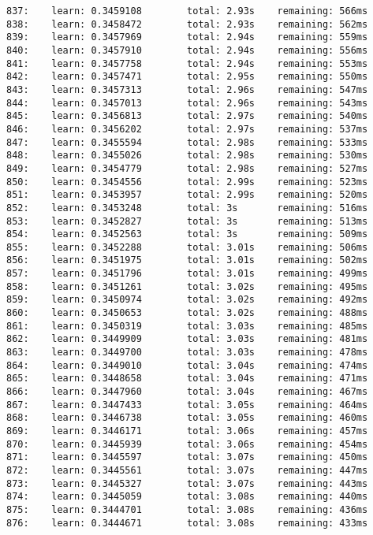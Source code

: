 \documentclass[11pt]{article}
\begin{document}
\begin{Verbatim}[commandchars=\\\{\}]
837:    learn: 0.3459108        total: 2.93s    remaining: 566ms
838:    learn: 0.3458472        total: 2.93s    remaining: 562ms
839:    learn: 0.3457969        total: 2.94s    remaining: 559ms
840:    learn: 0.3457910        total: 2.94s    remaining: 556ms
841:    learn: 0.3457758        total: 2.94s    remaining: 553ms
842:    learn: 0.3457471        total: 2.95s    remaining: 550ms
843:    learn: 0.3457313        total: 2.96s    remaining: 547ms
844:    learn: 0.3457013        total: 2.96s    remaining: 543ms
845:    learn: 0.3456813        total: 2.97s    remaining: 540ms
846:    learn: 0.3456202        total: 2.97s    remaining: 537ms
847:    learn: 0.3455594        total: 2.98s    remaining: 533ms
848:    learn: 0.3455026        total: 2.98s    remaining: 530ms
849:    learn: 0.3454779        total: 2.98s    remaining: 527ms
850:    learn: 0.3454556        total: 2.99s    remaining: 523ms
851:    learn: 0.3453957        total: 2.99s    remaining: 520ms
852:    learn: 0.3453248        total: 3s       remaining: 516ms
853:    learn: 0.3452827        total: 3s       remaining: 513ms
854:    learn: 0.3452563        total: 3s       remaining: 509ms
855:    learn: 0.3452288        total: 3.01s    remaining: 506ms
856:    learn: 0.3451975        total: 3.01s    remaining: 502ms
857:    learn: 0.3451796        total: 3.01s    remaining: 499ms
858:    learn: 0.3451261        total: 3.02s    remaining: 495ms
859:    learn: 0.3450974        total: 3.02s    remaining: 492ms
860:    learn: 0.3450653        total: 3.02s    remaining: 488ms
861:    learn: 0.3450319        total: 3.03s    remaining: 485ms
862:    learn: 0.3449909        total: 3.03s    remaining: 481ms
863:    learn: 0.3449700        total: 3.03s    remaining: 478ms
864:    learn: 0.3449010        total: 3.04s    remaining: 474ms
865:    learn: 0.3448658        total: 3.04s    remaining: 471ms
866:    learn: 0.3447960        total: 3.04s    remaining: 467ms
867:    learn: 0.3447433        total: 3.05s    remaining: 464ms
868:    learn: 0.3446738        total: 3.05s    remaining: 460ms
869:    learn: 0.3446171        total: 3.06s    remaining: 457ms
870:    learn: 0.3445939        total: 3.06s    remaining: 454ms
871:    learn: 0.3445597        total: 3.07s    remaining: 450ms
872:    learn: 0.3445561        total: 3.07s    remaining: 447ms
873:    learn: 0.3445327        total: 3.07s    remaining: 443ms
874:    learn: 0.3445059        total: 3.08s    remaining: 440ms
875:    learn: 0.3444701        total: 3.08s    remaining: 436ms
876:    learn: 0.3444671        total: 3.08s    remaining: 433ms

\end{Verbatim}
\end{document}
